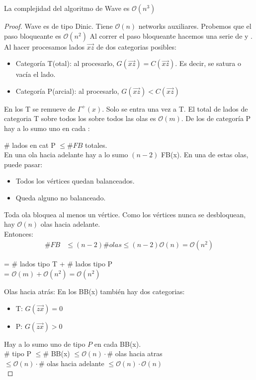 \begin{theorem}
La complejidad del algoritmo de Wave es $\mathcal{O}(n^3)$
\end{theorem}

\begin{proof}
Wave es de tipo Dinic. Tiene $\mathcal{O}(n)$ networks auxiliares. Probemos que el paso bloqueante es $\mathcal{O}(n^2)$
Al correr el paso bloqueante hacemos una serie de  y .
Al hacer  procesamos lados $\overrightarrow{xz}$ de dos categorias posibles:
\begin{itemize}
    \item Categoría T(otal): al procesarlo, $G(\overrightarrow{xz}) = C(\overrightarrow{xz})$. Es decir, se satura o vacía el lado.
    \item Categoría P(arcial): al procesarlo, $G(\overrightarrow{xz}) < C(\overrightarrow{xz})$
\end{itemize}
En los T se remueve de $\Gamma^+(x)$. Solo se entra una vez a T.
El total de lados de categoria T sobre todos los  sobre todos las olas es $\mathcal{O}(m)$.
De los de categoría P hay a lo sumo uno en cada :

$\#$ lados en cat P $\le \#FB$ totales.\\
En una ola hacia adelante hay a lo sumo $(n-2)$ FB(x).
En una de estas olas, puede pasar:
\begin{itemize}
    \item Todos los vértices quedan balanceados.
    \item Queda alguno no balanceado.
\end{itemize}
Toda ola bloquea al menos un vértice.
Como los vértices nunca se desbloquean, hay $\mathcal{O}(n)$ olas hacia adelante.\\
Entonces:
\begin{align}
\#FB &\le (n-2) \# olas
     \le (n-2) \mathcal{O}(n) = \mathcal{O}(n^2)
\end{align}

 = \# lados tipo T + \# lados tipo P\\
= $\mathcal{O}(m) + \mathcal{O}(n^2) = \mathcal{O}(n^2)$

Olas hacia atrás:
En los BB(x) también hay dos categorias:\begin{itemize}
    \item T: $G(\overrightarrow{zx})  = 0$
    \item P: $G(\overrightarrow{zx}) > 0$
\end{itemize}
Hay a lo sumo uno de tipo $P$ en cada BB(x).\\
$\#$ tipo P $\le \#$ BB(x)
$\le \mathcal{O}(n) \cdot \#$ olas hacia atras \\
$\le \mathcal{O}(n) \cdot \#$ olas hacia adelante
$\le \mathcal{O}(n) \cdot \mathcal{O}(n)$\\


\end{proof}
